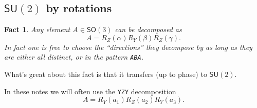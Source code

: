 \documentclass[12pt,dvipsnames]{article}
\newcommand{\SU}[1]{\mathsf{SU} (#1)}
\newcommand{\SO}[1]{\mathsf{SO} (#1)}
\newcommand{\1}{\mathbb{1}}
\theoremstyle{plain}
\newtheorem{fact}[theorem]{Fact}
\begin{document}
\subsection{$\SU{2}$ by rotations}

\begin{fact}
    Any element $A\in\SO{3}$ can be decomposed as
    \begin{equation}
        A = R_Z(\alpha)R_Y(\beta)R_Z(\gamma).
    \end{equation}
    In fact one is free to choose the ``directions'' they decompose by as long as they are either all distinct, or in the pattern \texttt{ABA}.
\end{fact}

What's great about this fact is that it transfers (up to phase) to $\SU{2}$.

In these notes we will often use the \texttt{YZY} decomposition
\begin{equation}
    A = R_Y(a_1)R_Z(a_2)R_Y(a_3).
\end{equation}
\end{document}
